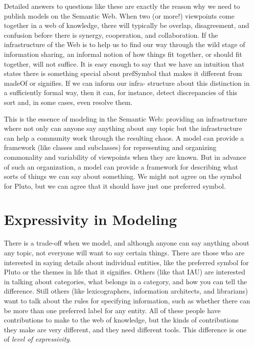 Detailed answers to questions like these are exactly the reason why we
need to publish models on the Semantic Web. When two (or more!)
viewpoints come together in a web of knowledge, there will typically be
overlap, disagreement, and confusion before there is synergy,
cooperation, and collaboration. If the infrastructure of the Web is to
help us to find our way through the wild stage of information sharing,
an informal notion of how things fit together, or should fit together,
will not suffice. It is easy enough to say that we have an intuition
that states there is something special about prefSymbol that makes it
different from madeOf or signifies. If we can inform our infra-
structure about this distinction in a sufficiently formal way, then it
can, for instance, detect discrepancies of this sort and, in some cases,
even resolve them.

This is the essence of modeling in the Semantic Web: providing an
infrastructure where not only can anyone say anything about any topic
but the infrastructure can help a community work through the resulting
chaos. A model can provide a framework (like classes and subclasses) for
representing and organizing commonality and variability of viewpoints
when they are known. But in advance of such an organization, a model can
provide a framework for describing what sorts of things we can say about
something. We might not agree on the symbol for Pluto, but we can agree
that it should have just one preferred symbol.

\section{Expressivity in Modeling}

There is a trade-off when we model, and although anyone can say anything
about any topic, not everyone will want to say certain things. There are
those who are interested in saying details about individual entities,
like the preferred symbol for Pluto or the themes in life that it
signifies. Others (like that IAU) are interested in talking about
categories, what belongs in a category, and how you can tell the
difference. Still others (like lexicographers, information architects,
and librarians) want to talk about the rules for specifying information,
such as whether there can be more than one preferred label for any
entity. All of these people have contributions to make to the web of
knowledge, but the kinds of contributions they make are very different,
and they need different tools. This difference is one of \emph{level of
expressivity}.

